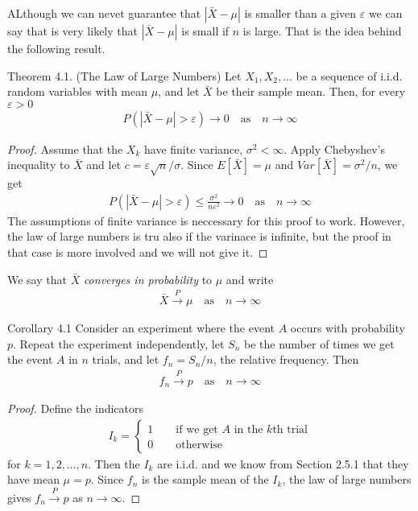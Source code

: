 ALthough we can nevet guarantee that $|\bar{X} - \mu|$ is smaller than a given $\varepsilon$ we can say that is very likely that $|\bar{X} - \mu|$ is small if $n$ is large. That is the idea behind the following result.
\begin{boks}{Theorem 4.1. (The Law of Large Numbers)}
  Let $X_1, X_2, \ldots$ be a sequence of i.i.d. random variables with mean $\mu$, and let $\bar{X}$ be their sample mean. Then, for every $\varepsilon > 0$
  \begin{align*}
    P(|\bar{X} - \mu| > \varepsilon) \rightarrow 0 \quad
    \text{as} \quad n \rightarrow \infty
  \end{align*}
\end{boks}
\begin{proof}
  Assume that the $X_k$ have finite variance, $\sigma^2 < \infty$.
  Apply Chebyshev's inequality to $\bar{X}$ and let $c = \varepsilon \sqrt{n}/\sigma$.
  Since $E[\bar{X}] = \mu$ and $Var[\bar{X}] = \sigma^2/n$, we get
  \begin{align*}
    P(|\bar{X} - \mu| > \varepsilon) \leq \frac{\sigma^2}{n\varepsilon^2} \rightarrow 0 \quad
    \text{as} \quad n \rightarrow \infty
  \end{align*}
The assumptions of finite variance is neccessary for this proof to work. However, the law of large numbers is tru also if the varinace is infinite, but the proof in that case is more involved and we will not give it.
\end{proof}
We say that $\bar{X}$ \textit{converges in probability} to $\mu$ and write
\begin{align*}
  \bar{X} \xrightarrow{P} \mu \quad \text{as} \quad n \rightarrow \infty
\end{align*}
\begin{boks}{Corollary 4.1}
  Consider an experiment where the event $A$ occurs with probability $p$. Repeat the experiment independently, let $S_n$ be the number of times we get the event $A$ in $n$ trials, and let $f_n = S_n/n$, the relative frequency. Then
  \begin{align*}
    f_n \xrightarrow{P} p \quad \text{as} \quad n \rightarrow \infty
  \end{align*}
\end{boks}
\vspace{-5mm}
\begin{proof}
  Define the indicators
  \begin{align*}
    I_k =
    \begin{cases}
      1 \qquad \text{if we get $A$ in the $k$th trial} \\
      0 \qquad \text{otherwise}
    \end{cases}
  \end{align*}
for $k = 1, 2, \ldots, n$. Then the $I_k$ are i.i.d. and we know from Section 2.5.1 that they have mean $\mu = p$. Since $f_n$ is the sample mean of the $I_k$, the law of large numbers gives $f_n \xrightarrow{P} p$ as $n \rightarrow \infty$.
\end{proof}
